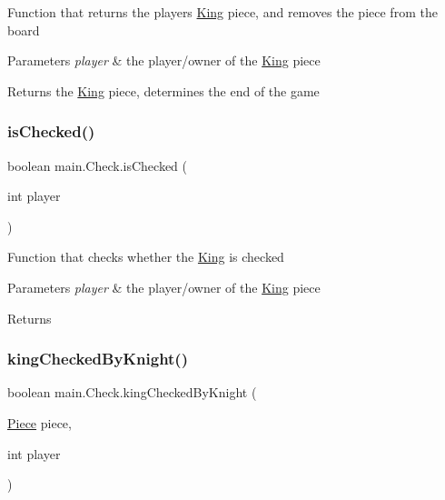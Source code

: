 Function that returns the player\textquotesingle{}s \hyperlink{classmain_1_1_king}{King} piece, and removes the piece from the board 
\begin{DoxyParams}{Parameters}
{\em player} & the player/owner of the \hyperlink{classmain_1_1_king}{King} piece \\
\hline
\end{DoxyParams}
\begin{DoxyReturn}{Returns}
the \hyperlink{classmain_1_1_king}{King} piece, determines the end of the game 
\end{DoxyReturn}
\mbox{\label{classmain_1_1_check_abb80139bcdc002c32dd5e721c490d800}} 
\subsubsection{\texorpdfstring{is\+Checked()}{isChecked()}}
{\footnotesize\ttfamily boolean main.\+Check.\+is\+Checked (\begin{DoxyParamCaption}\item[{int}]{player }\end{DoxyParamCaption})}

Function that checks whether the \hyperlink{classmain_1_1_king}{King} is checked 
\begin{DoxyParams}{Parameters}
{\em player} & the player/owner of the \hyperlink{classmain_1_1_king}{King} piece \\
\hline
\end{DoxyParams}
\begin{DoxyReturn}{Returns}

\end{DoxyReturn}
\mbox{\label{classmain_1_1_check_ad437a473d382218735067a8ba65dddc4}} 
\subsubsection{\texorpdfstring{king\+Checked\+By\+Knight()}{kingCheckedByKnight()}}
{\footnotesize\ttfamily boolean main.\+Check.\+king\+Checked\+By\+Knight (\begin{DoxyParamCaption}\item[{\hyperlink{classmain_1_1_piece}{Piece}}]{piece,  }\item[{int}]{player }\end{DoxyParamCaption})}

